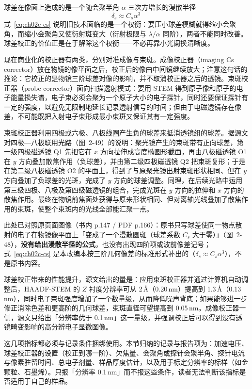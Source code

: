 \begin{principle}
球差在像面上造成的是一个随会聚半角 $\alpha$ 三次方增长的漫散半径
\begin{equation}
\delta_s \approx C_s\alpha^{3}
\label{eq:ch02c-cs}
\end{equation}
式~\eqref{eq:ch02c-cs} 说明旧技术面临的是一个权衡：要压小球差模糊就得缩小会聚角，而缩小会聚角又使衍射斑变大（衍射极限与 $\lambda/\alpha$ 同阶），两者不能同时改善。球差校正的价值正是在于解除这个权衡——不必再靠小光阑换清晰度。

现在商业化的校正器有两类，分别对准成像与束斑。成像校正器（imaging Cs corrector）放在物镜的像平面之后，校正后的像由中间镜继续放大；注意这句话的推论：它校正的是物镜三阶球差对像的影响，并不取消校正器之后的透镜。束斑校正器（probe corrector）面向扫描透射模式：要用 STEM 得到原子像和原子的电子能量损失谱，电子束必须会聚为一个原子大小的电子探针，同时还要保证探针有一定的强度，以避免无限制地延长记录透射信号的时间；但由于电磁透镜存在像差，不可能既把入射电子束形成最小束斑又保证其有一定强度。

束斑校正器利用四极或六极、八极线圈产生负的球差来抵消透镜组的球差。据源文对四极—八极联用光路（图~2-49）的说明：聚光镜产生的束斑带有正向球差，第一级四极磁透镜 Q1 先把它在 $x$ 方向拉伸成高度椭圆形截面，再由八极磁透镜 O1 在 $y$ 方向叠加散焦作用（负球差），并由第二级四极磁透镜 Q2 把束斑复形；于是在第二级八极磁透镜 O2 的平面上，得到了与原聚光镜出射束斑形状相同、但在 $y$ 方向叠加了负球差的光斑，完成了 $y$ 方向的球差调整。同理，在后续光路中运用第三级四极、八极及第四级磁透镜的组合，完成光斑在 $y$ 方向的拉伸和 $x$ 方向的散焦作用。最终在物镜前焦面处获得与原来形状相同、但对离轴光线叠加了散焦作用的束斑，使整个束斑内的光线全部能汇聚一点。
\end{principle}

此处已对照原页面图像（书内 p.147 / PDF p.166）：原书只写球差使同一物点散射的电子在物镜像平面上「变成了一个漫散圆斑（球差系数 $C_s$ 大于零）」（图~2-48），\textbf{没有给出漫散半径的公式}，也没有出现四阶项或波前像差记号；式~\eqref{eq:ch02c-cs} 是本改编本按三阶几何像差的标准形式补出的（$\delta_s\approx C_s\alpha^{3}$），不是原书内容。

\begin{measure}
球差校正带来的性能提升，源文给出的量是：应用束斑校正器并通过计算机自动调整后，HAADF-STEM 的 $Z$ 衬度分辨率可从 2\,\AA（0.20\,nm）提高到 1.3\,\AA（0.13\,nm），同时电子束斑强度增加了一个数量级，从而降低噪声背底；如果能够进一步修正消除色差和更高阶的几何球差，束斑直径可望提高到 0.05\,nm。成像校正器一侧，源文只给出「分辨率优于 0.1\,nm」这一量级，并强调校正后可以得到没有透镜畸变影响的高分辨电子显微图像。

这几项指标都必须与记录条件捆绑使用。本节归纳的记录与报告项为：加速电压、球差校正器的设置（校正到哪一阶）、欠焦量、会聚角或探针会聚半角、探针电流与像素驻留时间、总电子剂量、样品厚度估计，以及用于标定分辨率的标样（如金颗粒、石墨烯）。只报「分辨率 0.1\,nm」而不报这些条件，读者无法判断该指标是否适用于自己的样品。
\end{measure}

